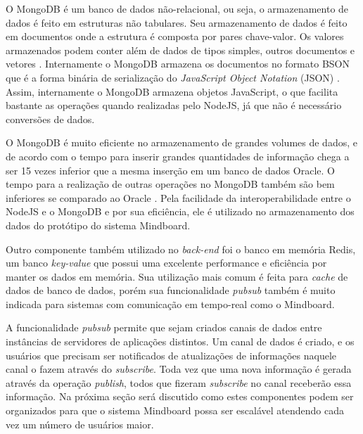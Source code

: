 O MongoDB é um banco de dados não-relacional, ou seja, o armazenamento de dados é feito em estruturas não tabulares. Seu armazenamento de dados é feito em documentos onde a estrutura é composta por pares chave-valor. Os valores armazenados podem conter além de dados de tipos simples, outros documentos e vetores \cite{mongodb_documentos}. Internamente o MongoDB armazena os documentos no formato BSON que é a forma binária de serialização do \emph{JavaScript Object Notation} (JSON) \cite{bson}. Assim, internamente o MongoDB armazena objetos JavaScript, o que facilita bastante as operações quando realizadas pelo NodeJS, já que não é necessário conversões de dados.

O MongoDB é muito eficiente no armazenamento de grandes volumes de dados, e de acordo com  o tempo para inserir grandes quantidades de informação chega a ser 15 vezes inferior que a mesma inserção em um banco de dados Oracle. O tempo para a realização de outras operações no MongoDB também são bem inferiores se comparado ao Oracle \cite{mongodb_oracle}. Pela facilidade da interoperabilidade entre o NodeJS e o MongoDB e por sua eficiência, ele é utilizado no armazenamento dos dados do protótipo do sistema Mindboard.

Outro componente também utilizado no \emph{back-end} foi o banco em memória Redis, um banco \emph{key-value} que possui uma excelente performance e eficiência por manter os dados em memória. Sua utilização mais comum é feita para \emph{cache} de dados de banco de dados, porém sua funcionalidade \emph{pubsub} também é muito indicada para sistemas com comunicação em tempo-real como o Mindboard.

A funcionalidade \emph{pubsub} \cite{redis_pubsub} permite que sejam criados canais de dados entre instâncias de servidores de aplicações distintos. Um canal de dados é criado, e os usuários que precisam ser notificados de atualizações de informações naquele canal o fazem através do \emph{subscribe}. Toda vez que uma nova informação é gerada através da operação \emph{publish}, todos que fizeram \emph{subscribe} no canal receberão essa informação. Na próxima seção será discutido como estes componentes podem ser organizados para que o sistema Mindboard possa ser escalável atendendo cada vez um número de usuários maior.



